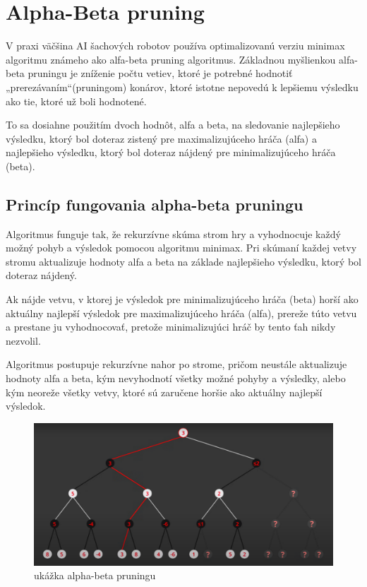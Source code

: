\documentclass[10pt,twoside,slovak,a4paper]{article}
\begin{document}
\section{Alpha-Beta pruning} \label{alpha-beta}
V praxi väčšina AI šachových robotov používa optimalizovanú verziu minimax algoritmu známeho ako alfa-beta pruning algoritmus. Základnou myšlienkou alfa-beta pruningu je zníženie počtu vetiev, ktoré je potrebné hodnotiť „prerezávaním“(pruningom) konárov, ktoré istotne nepovedú k lepšiemu výsledku ako tie, ktoré už boli hodnotené. 

To sa dosiahne použitím dvoch hodnôt, alfa a beta, na sledovanie najlepšieho výsledku, ktorý bol doteraz zistený pre maximalizujúceho hráča (alfa) a najlepšieho výsledku, ktorý bol doteraz nájdený pre minimalizujúceho hráča (beta).\cite{Alpha-Beta}

\subsection{Princíp fungovania alpha-beta pruningu} \label{principAlpha-beta}
Algoritmus funguje tak, že rekurzívne skúma strom hry a vyhodnocuje každý možný pohyb a výsledok pomocou algoritmu minimax. Pri skúmaní každej vetvy stromu aktualizuje hodnoty alfa a beta na základe najlepšieho výsledku, ktorý bol doteraz nájdený.

Ak nájde vetvu, v ktorej je výsledok pre minimalizujúceho hráča (beta) horší ako aktuálny najlepší výsledok pre maximalizujúceho hráča (alfa), prereže túto vetvu a prestane ju vyhodnocovať, pretože minimalizujúci hráč by tento ťah nikdy nezvolil. 

Algoritmus postupuje rekurzívne nahor po strome, pričom neustále aktualizuje hodnoty alfa a beta, kým nevyhodnotí všetky možné pohyby a výsledky, alebo kým neoreže všetky vetvy, ktoré sú zaručene horšie ako aktuálny najlepší výsledok.
\begin{figure}[h]
    \centering
    \includegraphics[width=\textwidth]{alpha-beta}
    \caption{ukážka alpha-beta pruningu}
    \label{obr2}
\end{figure}
\end{document}
